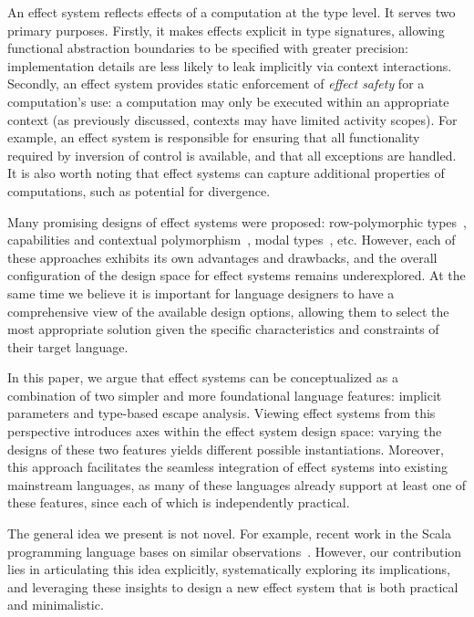 \documentclass[acmsmall]{acmart}
\begin{document}
An effect system reflects effects of a computation at the type level.
It serves two primary purposes.
Firstly, it makes effects explicit in type signatures, allowing functional abstraction boundaries to be specified with greater precision: implementation details are less likely to leak implicitly via context interactions.
Secondly, an effect system provides static enforcement of \textit{effect safety} for a computation’s use: a computation may only be executed within an appropriate context (as previously discussed, contexts may have limited activity scopes).
For example, an effect system is responsible for ensuring that all functionality required by inversion of control is available, and that all exceptions are handled.
It is also worth noting that effect systems can capture additional properties of computations, such as potential for divergence.

Many promising designs of effect systems were proposed: row-polymorphic types~\cite{leijen2014koka}, capabilities and contextual polymorphism~\cite{brachthauser2022effects, boruch2023capturing}, modal types~\cite{tang2025modal}, etc.
However, each of these approaches exhibits its own advantages and drawbacks, and the overall configuration of the design space for effect systems remains underexplored.
At the same time we believe it is important for language designers to have a comprehensive view of the available design options, allowing them to select the most appropriate solution given the specific characteristics and constraints of their target language.

In this paper, we argue that effect systems can be conceptualized as a combination of two simpler and more foundational language features: implicit parameters and type-based escape analysis.
Viewing effect systems from this perspective introduces axes within the effect system design space: varying the designs of these two features yields different possible instantiations.
Moreover, this approach facilitates the seamless integration of effect systems into existing mainstream languages, as many of these languages already support at least one of these features, since each of which is independently practical.

The general idea we present is not novel.
For example, recent work in the Scala programming language bases on similar observations~\cite{odersky2021safer, boruch2023capturing}.
However, our contribution lies in articulating this idea explicitly, systematically exploring its implications, and leveraging these insights to design a new effect system that is both practical and minimalistic.
\end{document}
